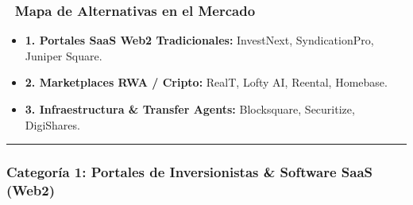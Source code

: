 \documentclass[
]{article}
\providecommand{\tightlist}{%
  \setlength{\itemsep}{0pt}\setlength{\parskip}{0pt}}
\renewenvironment{quote}{%
  \vspace{0.4em}
  \begin{tcolorbox}[
    colback=bridsLight,
    colframe=bridsBlue,
    arc=2mm,
    boxrule=1.2pt,
    left=10pt,
    right=10pt,
    top=8pt,
    bottom=8pt,
    before skip=6pt,
    after skip=8pt
  ]%
}{%
  \end{tcolorbox}%
}
\begin{document}
\begin{quote}
\mbox{}%
\subsubsection{🧭 Mapa de Alternativas en el
Mercado}\label{mapa-de-alternativas-en-el-mercado}

\begin{itemize}
\tightlist
\item
  \textbf{1. Portales SaaS Web2 Tradicionales:} InvestNext,
  SyndicationPro, Juniper Square.
\item
  \textbf{2. Marketplaces RWA / Cripto:} RealT, Lofty AI, Reental,
  Homebase.
\item
  \textbf{3. Infraestructura \& Transfer Agents:} Blocksquare,
  Securitize, DigiShares.
\end{itemize}
\end{quote}

\begin{center}\rule{0.5\linewidth}{0.5pt}\end{center}

\subsubsection{Categoría 1: Portales de Inversionistas \& Software SaaS
(Web2)}\label{categoruxeda-1-portales-de-inversionistas-software-saas-web2}
\end{document}
